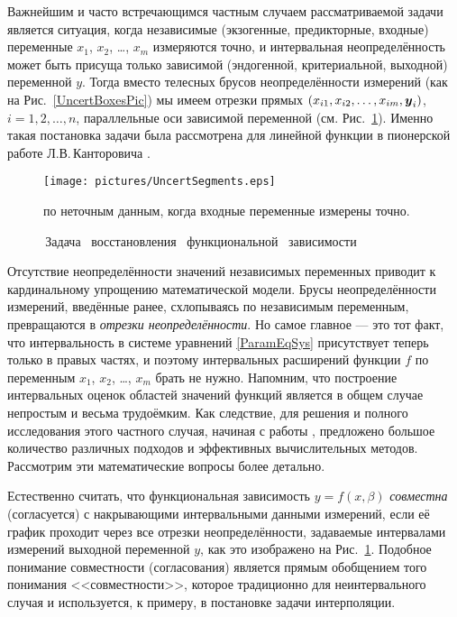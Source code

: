 \documentclass[a5paper,openany]{book}
\newcommand{\mbf}[1]{\protect\text{\boldmath$#1$}}
\begin{document}
  
Важнейшим и часто встречающимся частным случаем рассматриваемой задачи является 
ситуация, когда независимые (экзогенные, предикторные, входные) переменные $x_1$, 
$x_2$, \ldots, $x_m$ измеряются точно, и интервальная неопределённость может быть 
присуща только зависимой (эндогенной, критериальной, выходной) переменной $y$. Тогда 
вместо телесных брусов неопределённости измерений (как на Рис.~\ref{UncertBoxesPic}) 
мы имеем отрезки прямых $(x_{i1}, x_{i2}, \ldots, x_{im}, \mbf{y}_{i})$, $i = 
1,2,\ldots,n$, параллельные оси зависимой переменной (см. Рис.~\ref{UncSegmentPic}). 
Именно такая постановка задачи была рассмотрена для линейной функции в пионерской 
работе Л.В.\,Канторовича \cite{Kantorovich}. 
  
   
\begin{figure}[!htb] 
\centering\small 
\texttt{[image: pictures/UncertSegments.eps]} 
\caption{\,Задача \, восстановления \, функциональной \, зависимости\,}  
         по неточным данным, когда входные переменные измерены точно. 
\label{UncSegmentPic} 
\end{figure} 
  
  
Отсутствие неопределённости значений независимых переменных приводит к кардинальному 
упрощению математической модели. Брусы неопределённости измерений, введённые ранее, 
схлопываясь по независимым переменным, превращаются в \emph{отрезки неопределённости}. 
 Но самое главное --- это тот факт, что интервальность 
в системе уравнений \eqref{ParamEqSys} присутствует теперь только в правых частях, и 
поэтому интервальных расширений функции $f$ по переменным $x_{1}$, $x_{2}$, \ldots, 
$x_{m}$ брать не нужно. Напомним, что построение интервальных оценок областей значений 
функций является в общем случае непростым и весьма трудоёмким. Как следствие, для решения 
и полного исследования этого частного случая, начиная с работы \cite{Kantorovich}, 
предложено большое количество различных подходов и эффективных вычислительных методов. 
Рассмотрим эти математические вопросы более детально. 
  
Естественно считать, что функциональная зависимость $y = f(x, \beta)$ \emph{совместна} 
(согласуется) с накрывающими интервальными данными измерений, если её график проходит 
через все отрезки неопределённости, задаваемые интервалами измерений выходной переменной 
$y$, как это изображено на Рис.~\ref{UncSegmentPic}. Подобное понимание совместности 
(согласования) является прямым обобщением того понимания <<совместности>>, которое 
традиционно для неинтервального случая и используется, к примеру, в постановке задачи 
интерполяции. 
  
\end{document}
